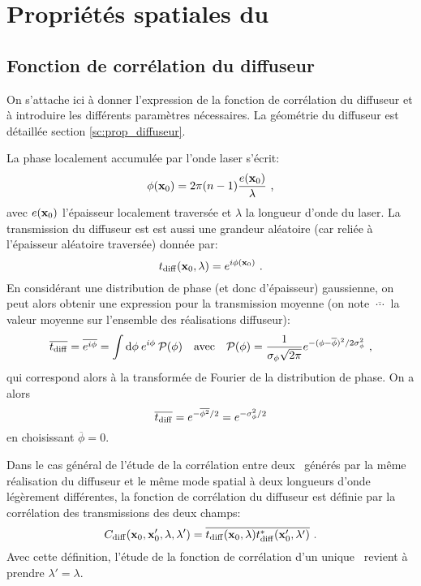 \chapter{Propriétés spatiales du \speckle}
\label{ch:anex_speckle}


\section{Fonction de corrélation du diffuseur}
On s'attache ici à donner l'expression de la fonction de corrélation du diffuseur et à introduire les différents paramètres nécessaires. La géométrie du diffuseur est détaillée section \ref{sc:prop_diffuseur}.

La phase localement accumulée par l'onde laser s'écrit:
\begin{equation}
\phi(\mathbf{x}_0)=2\pi (n-1) \frac{e(\mathbf{x}_0)}{\lambda} \text{ ,}
\end{equation}
avec $e(\mathbf{x}_0)$ l'épaisseur localement traversée et $\lambda$ la longueur d'onde du laser. La transmission du diffuseur est est aussi une grandeur aléatoire (car reliée à l'épaisseur aléatoire traversée) donnée par:
\begin{equation}
t_{\mathrm{diff}}(\mathbf{x}_0,\lambda)=e^{i \phi(\mathbf{x}_0)} \text{ .}
\end{equation}
En considérant une distribution de phase (et donc d'épaisseur) gaussienne, on peut alors obtenir une expression pour la transmission moyenne (on note $\overline{\:\cdots\:}$ la valeur moyenne sur l'ensemble des réalisations diffuseur):
\begin{equation}
\overline{t_{\mathrm{diff}}}= \overline{e^{i \phi}} = \int{ \mathrm{d}\phi \: e^{i \phi} \: \mathcal{P}(\phi)} \quad \text{avec} \quad \mathcal{P}(\phi) = \frac{1}{\sigma_{\phi} \sqrt{2 \pi}} e^{-(\phi - \overline{\phi})^2 /2 \sigma_{\phi}^2} \text{ ,}
\end{equation}
qui correspond alors à la transformée de Fourier de la distribution de phase. On a alors
\begin{equation}
\overline{t_{\mathrm{diff}}} = e^{-\overline{\phi^2}/2} = e^{-\sigma_{\phi}^2/2}
\end{equation}
en choisissant $\overline{\phi}=0$. 

Dans le cas général de l'étude de la corrélation entre deux \speckles\ générés par la même réalisation du diffuseur et le même mode spatial à deux longueurs d'onde légèrement différentes, la fonction de corrélation du diffuseur est définie par la corrélation des transmissions des deux champs:
\begin{equation}
C_{\mathrm{diff}}(\mathbf{x}_0,\mathbf{x}_0',\lambda,\lambda')=\overline{t_{\mathrm{diff}}(\mathbf{x}_0,\lambda)t_{\mathrm{diff}}^*(\mathbf{x}_0',\lambda')} \text{ .}
\end{equation}
Avec cette définition, l'étude de la fonction de corrélation d'un unique \speckle\ revient à prendre $\lambda'=\lambda$. 

